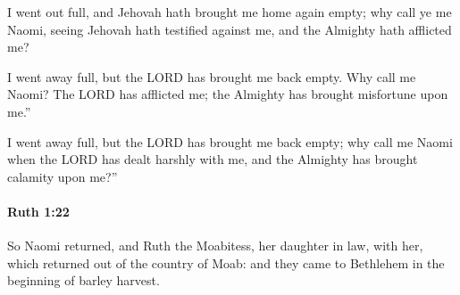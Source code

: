 			\begin{versebox}
					\item[BHS] 
					\item[LXX] 
					\item[ASV] I went out full, and Jehovah hath brought me home again empty; why call ye me Naomi, seeing Jehovah hath testified against me, and the Almighty hath afflicted me?
					\item[NIV] I went away full, but the LORD has brought me back empty. Why call me Naomi? The LORD has afflicted me; the Almighty has brought misfortune upon me.”
					\item[NRSV] I went away full, but the LORD has brought me back empty; why call me Naomi when the LORD has dealt harshly with me, and the Almighty has brought calamity upon me?”
			\end{versebox}

		\paragraph{Ruth 1:22} %
			\label{RUTH-1-22}

			So Naomi returned, and Ruth the Moabitess, her daughter in law, with her, which returned out of the country of Moab: and they came to Bethlehem in the beginning of barley harvest.


